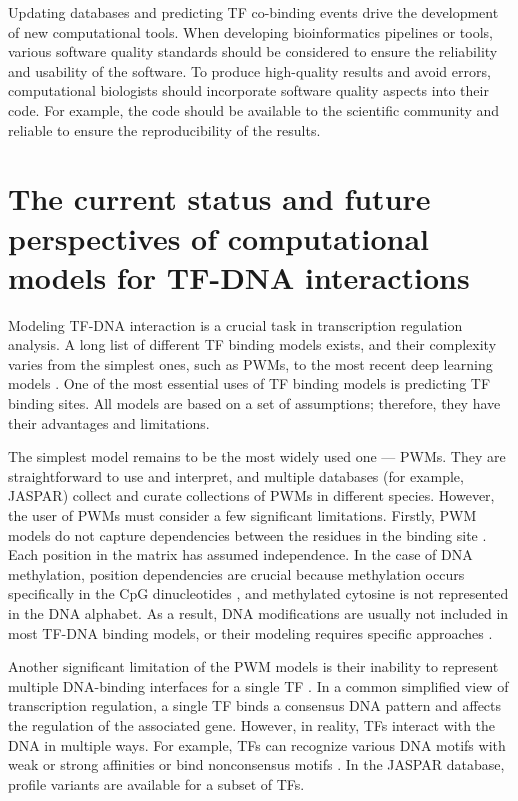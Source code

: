 Updating databases and predicting TF co-binding events drive the development of new computational tools. When developing bioinformatics pipelines or tools, various software quality standards should be considered to ensure the reliability and usability of the software. To produce high-quality results and avoid errors, computational biologists should incorporate software quality aspects into their code. For example, the code should be available to the scientific community and reliable to ensure the reproducibility of the results.

    \section{The current status and future perspectives of computational models for TF-DNA interactions}

    Modeling TF-DNA interaction is a crucial task in transcription regulation analysis. A long list of different TF binding models exists, and their complexity varies from the simplest ones, such as PWMs, to the most recent deep learning models \cite{stormo1982use,siddharthan2010dinucleotide,mathelier2013next,xing2002hierarchical,zhao2012improved,stormo2013modeling,santolini2014general,alipanahi2015predicting,zhou2015predicting,avsec2021base}. One of the most essential uses of TF binding models is predicting TF binding sites. All models are based on a set of assumptions; therefore, they have their advantages and limitations.

    The simplest model remains to be the most widely used one --- PWMs. They are straightforward to use and interpret, and multiple databases (for example, JASPAR) collect and curate collections of PWMs in different species. However, the user of PWMs must consider a few significant limitations. Firstly, PWM models do not capture dependencies between the residues in the binding site \cite{weirauch2013evaluation}. Each position in the matrix has assumed independence. In the case of DNA methylation, position dependencies are crucial because methylation occurs specifically in the CpG dinucleotides \cite{wang2019identification,schubeler2015function}, and methylated cytosine is not represented in the DNA alphabet. As a result, DNA modifications are usually not included in most TF-DNA binding models, or their modeling requires specific approaches \cite{grau2023widespread,viner2024modeling}.

    Another significant limitation of the PWM models is their inability to represent multiple DNA-binding interfaces for a single TF \cite{weirauch2013evaluation}. In a common simplified view of transcription regulation, a single TF binds a consensus DNA pattern and affects the regulation of the associated gene. However, in reality, TFs interact with the DNA in multiple ways. For example, TFs can recognize various DNA motifs with weak or strong affinities or bind nonconsensus motifs \cite{slattery2014absence}. In the JASPAR database, profile variants are available for a subset of TFs.

